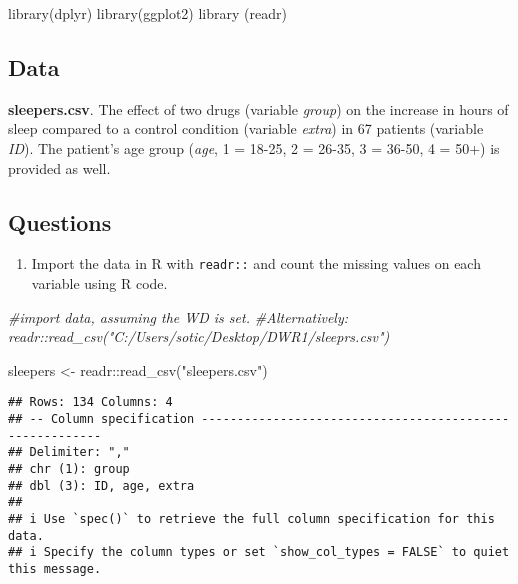 \documentclass[
]{article}
\newenvironment{Shaded}{\begin{snugshade}}{\end{snugshade}}
\newcommand{\CommentTok}[1]{\textcolor[rgb]{0.56,0.35,0.01}{\textit{#1}}}
\newcommand{\FunctionTok}[1]{\textcolor[rgb]{0.00,0.00,0.00}{#1}}
\newcommand{\NormalTok}[1]{#1}
\newcommand{\OtherTok}[1]{\textcolor[rgb]{0.56,0.35,0.01}{#1}}
\newcommand{\SpecialCharTok}[1]{\textcolor[rgb]{0.00,0.00,0.00}{#1}}
\newcommand{\StringTok}[1]{\textcolor[rgb]{0.31,0.60,0.02}{#1}}
\providecommand{\tightlist}{%
  \setlength{\itemsep}{0pt}\setlength{\parskip}{0pt}}
\begin{document}
\begin{Shaded}
\begin{Highlighting}[]
\FunctionTok{library}\NormalTok{(dplyr)}
\FunctionTok{library}\NormalTok{(ggplot2)}
\FunctionTok{library}\NormalTok{ (readr)}
\end{Highlighting}
\end{Shaded}

\hypertarget{data}{%
\subsection{Data}\label{data}}

\textbf{sleepers.csv}. The effect of two drugs (variable \emph{group})
on the increase in hours of sleep compared to a control condition
(variable \emph{extra}) in 67 patients (variable \emph{ID}). The
patient's age group (\emph{age}, 1 = 18-25, 2 = 26-35, 3 = 36-50, 4 =
50+) is provided as well.

\hypertarget{questions}{%
\subsection{Questions}\label{questions}}

\begin{enumerate}
\def\labelenumi{\arabic{enumi}.}
\tightlist
\item
  Import the data in R with \texttt{readr::} and count the missing
  values on each variable using R code.
\end{enumerate}

\begin{Shaded}
\begin{Highlighting}[]
\CommentTok{\#import data, assuming the WD is set. }
\CommentTok{\#Alternatively: readr::read\_csv("C:/Users/sotic/Desktop/DWR1/sleeprs.csv")}

\NormalTok{sleepers }\OtherTok{\textless{}{-}}\NormalTok{ readr}\SpecialCharTok{::}\FunctionTok{read\_csv}\NormalTok{(}\StringTok{"sleepers.csv"}\NormalTok{)}
\end{Highlighting}
\end{Shaded}

\begin{verbatim}
## Rows: 134 Columns: 4
## -- Column specification --------------------------------------------------------
## Delimiter: ","
## chr (1): group
## dbl (3): ID, age, extra
## 
## i Use `spec()` to retrieve the full column specification for this data.
## i Specify the column types or set `show_col_types = FALSE` to quiet this message.
\end{verbatim}
\end{document}
